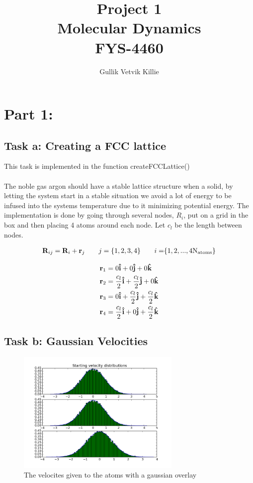 \documentclass[11pt]{article}
\title{ Project 1 \\ Molecular Dynamics \\ FYS-4460 }
\author{Gullik Vetvik Killie }
\begin{document}
\maketitle

\tableofcontents

\section{Part 1:}
	\subsection{Task a: Creating a FCC lattice}
	This task is implemented in the function createFCCLattice()
	\\ \\
		\noindent The noble gas argon should have a stable lattice structure when a solid, by letting the system start in a stable situation we avoid a lot of energy to be infused into the systems temperature due to it minimizing potential energy. The implementation is done by going through several nodes, \(R_i\), put on a grid in the box and then placing 4 atoms around each node. Let \(c_l\) be the length between nodes.

		\begin{align*}
		\vb{R}_{ij} = \vb{R}_i + \vb{r}_j \qquad{j }= \{1,2,3,4\} \qquad{i = }\{1,2, ... , 4\text{N}_{\text{atoms}}\}
		\end{align*}

		\begin{align*}
			\vb{r}_1 &= 0 \vu{i} + 0 \vu{j} + 0 \vu{k}
			\\
			\vb{r}_2 &= \frac{c_l}{2} \vu{i} + \frac{c_l}{2} \vu{j} + 0 \vu{k}
			\\
			\vb{r}_3 &= 0 \vu{i} + \frac{c_l}{2} \vu{j} + \frac{c_l}{2} \vu{k}
			\\
			\vb{r}_4 &= \frac{c_l}{2} \vu{i} + 0 \vu{j} + \frac{c_l}{2} \vu{k}
		\end{align*}

	\subsection{Task b: Gaussian Velocities}

		\begin{figure}
			\center
			\includegraphics[width = 0.7\textwidth]{Figures/velocityDistributions}
			\caption{The velocites given to the atoms with a gaussian overlay}
		\end{figure}
\end{document}
